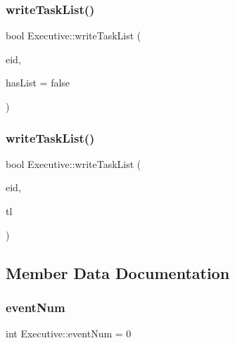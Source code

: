 \subsubsection{\texorpdfstring{write\+Task\+List()}{writeTaskList()}\hspace{0.1cm}{\footnotesize\ttfamily [1/2]}}
{\footnotesize\ttfamily bool Executive\+::write\+Task\+List (\begin{DoxyParamCaption}\item[{int}]{eid,  }\item[{bool}]{has\+List = {\ttfamily false} }\end{DoxyParamCaption})}

\mbox{\label{class_executive_ae4225a37c7c9f8299c59eb1cc07d221a}} 
\subsubsection{\texorpdfstring{write\+Task\+List()}{writeTaskList()}\hspace{0.1cm}{\footnotesize\ttfamily [2/2]}}
{\footnotesize\ttfamily bool Executive\+::write\+Task\+List (\begin{DoxyParamCaption}\item[{int}]{eid,  }\item[{std\+::shared\+\_\+ptr$<$ \mbox{\hyperlink{class_task_list}{Task\+List}} $>$}]{tl }\end{DoxyParamCaption})}



\subsection{Member Data Documentation}
\mbox{\label{class_executive_ab285c21199444e024f7b0df423f51827}} 
\subsubsection{\texorpdfstring{event\+Num}{eventNum}}
{\footnotesize\ttfamily int Executive\+::event\+Num = 0}

\mbox{\label{class_executive_a80e57f901c3182811a700674066edb4d}} 
